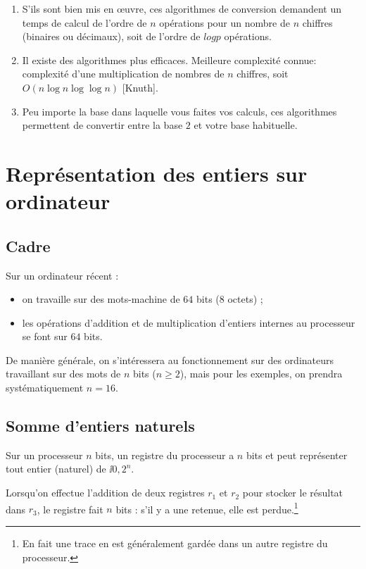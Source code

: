 \begin{rem}
\begin{enumerate}
\item S'ils sont bien mis en œuvre, ces algorithmes de conversion demandent
un temps de calcul de l'ordre de $n$ opérations pour un nombre de $n$ chiffres
(binaires ou décimaux), soit de l'ordre de $log p$ opérations.
\item Il existe des algorithmes plus efficaces. Meilleure complexité
  connue: complexité d'une multiplication de nombres de $n$ chiffres,
  soit $O(n\log n \log \log n)$ [Knuth].
\item Peu importe la base dans laquelle vous faites vos calculs, ces
  algorithmes permettent de convertir entre la base $2$ et votre base
  habituelle. 
\end{enumerate}
\end{rem}

\section{Représentation des entiers sur ordinateur}
\subsection{Cadre}
Sur un ordinateur récent :
\begin{itemize}
\item[\textbullet] on travaille sur des mots-machine de $64$ bits ($8$ octets) ;
\item[\textbullet] les opérations d'addition et de multiplication d'entiers internes au
  processeur se font sur $64$ bits.
\end{itemize}

De manière générale, on s'intéressera au fonctionnement sur des
ordinateurs travaillant sur des mots de $n$ bits ($n\geq 2$), mais pour les
exemples, on prendra systématiquement $n=16$.

\subsection{Somme d'entiers naturels}
\sloppy

Sur un processeur $n$ bits, un registre du processeur a $n$ bits et peut
  représenter tout entier (naturel) de $\ii{0,2^{n}}$.

 Lorsqu'on effectue l'addition de deux registres $r_{1}$ et
  $r_{2}$ pour stocker le résultat dans $r_{3}$, le registre fait $n$
  bits : s'il y a une retenue, elle est perdue.\footnote{En fait une
    trace en est généralement gardée dans un autre registre du
    processeur.}

